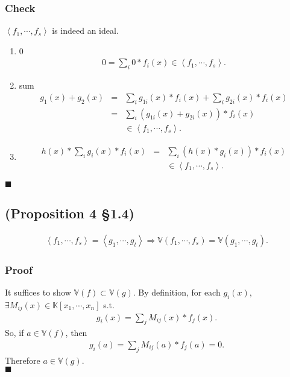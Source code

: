 \documentclass[11pt]{book}
\begin{document}
\subsubsection{Check}
$\left< f_1, \cdots, f_s \right> $ is indeed an ideal.
\begin{enumerate}
\item 0
\begin{eqnarray}
0 = \sum_i 0 * f_i(x) \in \left< f_1, \cdots, f_s \right>.
\end{eqnarray}

\item sum
\begin{eqnarray}
g_1(x) + g_2(x) &=& \sum_i g_{1i}(x) * f_i(x) + \sum_i g_{2i}(x) * f_i(x) \\
&=& \sum_i (g_{1i}(x) + g_{2i}(x)) * f_i(x) \\
&& \in \left< f_1, \cdots, f_s \right>.
\end{eqnarray}

\item 
\begin{eqnarray}
h(x) * \sum_i g_{i}(x) * f_i(x) &=& \sum_i \left( h(x) *g_{i}(x) \right) * f_i(x) \\
&& \in \left< f_1, \cdots, f_s \right>.
\end{eqnarray}

\end{enumerate}
$\blacksquare$

\subsection{(Proposition 4 \S1.4)}
\begin{eqnarray}
\left< f_1, \cdots, f_s \right> = \left< g_1, \cdots, g_t \right> \Rightarrow \mathbb{V}(f_1, \cdots, f_s) = \mathbb{V}(g_1, \cdots, g_t).
\end{eqnarray}

\subsubsection{Proof}
It suffices to show $\mathbb{V}(f) \subset \mathbb{V}(g)$.
By definition, for each $g_i(x)$, $\exists M_{ij}(x) \in \mathbb{K}[x_1,\cdots,x_n]$ s.t.
\begin{eqnarray}
g_i(x) = \sum_j M_{ij}(x) * f_j(x).
\end{eqnarray}
So, if $a \in \mathbb{V}(f)$, then
\begin{eqnarray}
g_i(a) = \sum_j M_{ij}(a) * f_j(a) = 0.
\end{eqnarray}
Therefore $a \in \mathbb{V}(g)$.\\
$\blacksquare$
\end{document}
